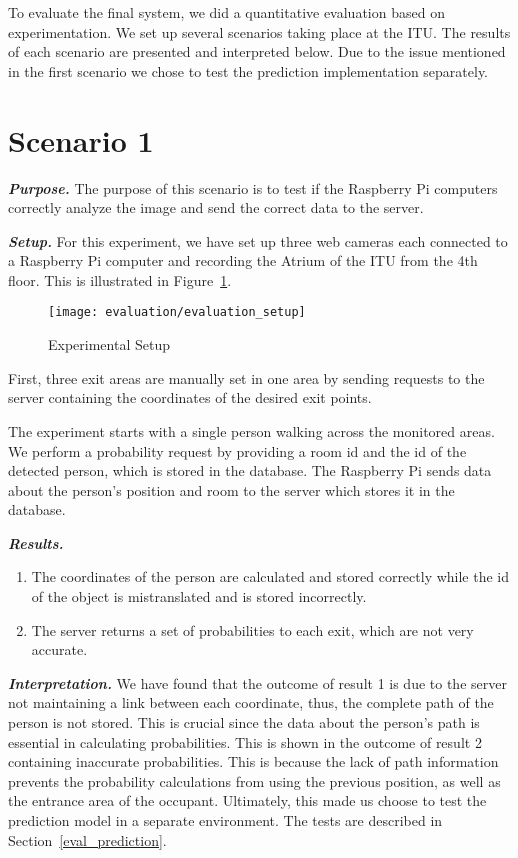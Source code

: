 To evaluate the final system, we did a quantitative evaluation based on experimentation. We set up several scenarios taking place at the ITU. The results of each scenario are presented and interpreted below. Due to the issue mentioned in the first scenario we chose to test the prediction implementation separately.

\section{Scenario 1}
\label{sec:scen1}
\textit{\textbf{Purpose.}} The purpose of this scenario is to test if the Raspberry Pi computers correctly analyze the image and send the correct data to the server.

\textit{\textbf{Setup.}} For this experiment, we have set up three web cameras each connected to a Raspberry Pi computer and recording the Atrium of the ITU from the 4th floor. This is illustrated in Figure~\ref{fig:evaluation_setup}.

\begin{figure}[htb]
	\centering
	\texttt{[image: evaluation/evaluation\_setup]}
	\caption{Experimental Setup}
	\label{fig:evaluation_setup}
\end{figure}

First, three exit areas are manually set in one area by sending requests to the server containing the coordinates of the desired exit points. 

The experiment starts with a single person walking across the monitored areas. We perform a probability request by providing a room id and the id of the detected person, which is stored in the database. The Raspberry Pi sends data about the person's position and room to the server which stores it in the database.

\textit{\textbf{Results.}}
\begin{enumerate}
\item The coordinates of the person are calculated and stored correctly while the id of the object is mistranslated and is stored incorrectly. 
\item The server returns a set of probabilities to each exit, which are not very accurate.
\end{enumerate}

\textit{\textbf{Interpretation.}}
We have found that the outcome of result 1 is due to the server not maintaining a link between each coordinate, thus, the complete path of the person is not stored.
This is crucial since the data about the person's path is essential in calculating probabilities. This is shown in the outcome of result 2 containing inaccurate probabilities. This is because the lack of path information prevents the probability calculations from using the previous position, as well as the entrance area of the occupant. Ultimately, this made us choose to test the prediction model in a separate environment. The tests are described in Section~\ref{eval_prediction}.

